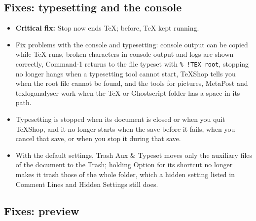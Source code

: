 \documentclass[11pt,letterpaper]{article}
\begin{document}
\subsection{Fixes: typesetting and the console}

\begin{itemize}
\item \textbf{Critical fix:} Stop now ends TeX; before, TeX kept running.
\item Fix problems with the console and typesetting: console output can be copied while TeX runs, broken characters in console output and logs are shown correctly, Command-1 returns to the file typeset with \texttt{\% !TEX root}, stopping no longer hangs when a typesetting tool cannot start, TeXShop tells you when the root file cannot be found, and the tools for pictures, MetaPost and texloganalyser work when the TeX or Ghostscript folder has a space in its path.
\item Typesetting is stopped when its document is closed or when you quit TeXShop, and it no longer starts when the save before it fails, when you cancel that save, or when you stop it during that save.
\item With the default settings, Trash Aux \& Typeset moves only the auxiliary files of the document to the Trash; holding Option for its shortcut no longer makes it trash those of the whole folder, which a hidden setting listed in Comment Lines and Hidden Settings still does.
\end{itemize}

\subsection{Fixes: preview}
\end{document}
